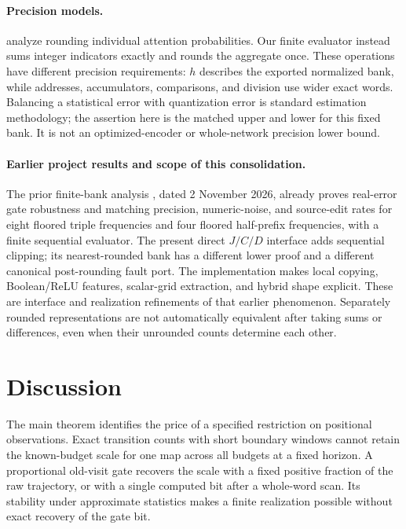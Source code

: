 \documentclass[11pt,letterpaper]{article}
\theoremstyle{definition}
\theoremstyle{remark}
\numberwithin{equation}{section}
\begin{document}
\paragraph{Precision models.}
\citet[Proposition 1]{MerrillSabharwal2023} analyze rounding individual attention probabilities. Our finite evaluator instead sums integer indicators exactly and rounds the aggregate once. These operations have different precision requirements: $h$ describes the exported normalized bank, while addresses, accumulators, comparisons, and division use wider exact words. Balancing a statistical error with quantization error is standard estimation methodology; the assertion here is the matched upper and lower for this fixed bank. It is not an optimized-encoder or whole-network precision lower bound.

\paragraph{Earlier project results and scope of this consolidation.}
The prior finite-bank analysis \citep{BCJ001}, dated 2 November 2026, already proves real-error gate robustness and matching precision, numeric-noise, and source-edit rates for eight floored triple frequencies and four floored half-prefix frequencies, with a finite sequential evaluator. The present direct $J/C/D$ interface adds sequential clipping; its nearest-rounded bank has a different lower proof and a different canonical post-rounding fault port. The implementation makes local copying, Boolean/ReLU features, scalar-grid extraction, and hybrid shape explicit. These are interface and realization refinements of that earlier phenomenon. Separately rounded representations are not automatically equivalent after taking sums or differences, even when their unrounded counts determine each other.

\section{Discussion}\label{sec:discussion}
The main theorem identifies the price of a specified restriction on positional observations. Exact transition counts with short boundary windows cannot retain the known-budget scale for one map across all budgets at a fixed horizon. A proportional old-visit gate recovers the scale with a fixed positive fraction of the raw trajectory, or with a single computed bit after a whole-word scan. Its stability under approximate statistics makes a finite realization possible without exact recovery of the gate bit.
\end{document}
